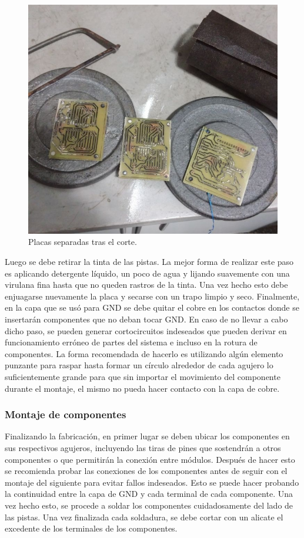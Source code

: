 \begin{figure}[ht!]
	\centering
	\includegraphics[width=0.6\linewidth]{imagenes/pcbeando/pos-corte.jpeg}
	\caption{Placas separadas tras el corte.}
	\label{fig:pos-corte}
\end{figure}

Luego se debe retirar la tinta de las pistas. La mejor forma de realizar este paso es aplicando detergente líquido, un poco de agua y lijando suavemente con una virulana fina hasta que no queden rastros de la tinta. Una vez hecho esto debe enjuagarse nuevamente la placa y secarse con un trapo limpio y seco.
Finalmente, en la capa que se usó para GND se debe quitar el cobre en los contactos donde se insertarán componentes que no deban tocar GND. En caso de no llevar a cabo dicho paso, se pueden generar cortocircuitos indeseados que pueden derivar en funcionamiento erróneo de partes del sistema e incluso en la rotura de componentes. La forma recomendada de hacerlo es utilizando algún elemento punzante para raspar hasta formar un círculo alrededor de cada agujero lo suficientemente grande para que sin importar el movimiento del componente durante el montaje, el mismo no pueda hacer contacto con la capa de cobre.


\subsubsection{Montaje de componentes}

Finalizando la fabricación, en primer lugar se deben ubicar los componentes en sus respectivos agujeros, incluyendo las tiras de pines que sostendrán a otros componentes o que permitirán la conexión entre módulos. Después de hacer esto se recomienda probar las conexiones de los componentes antes de seguir con el montaje del siguiente para evitar fallos indeseados. Esto se puede hacer probando la continuidad entre la capa de GND y cada terminal de cada componente. Una vez hecho esto, se procede a soldar los componentes cuidadosamente del lado de las pistas. Una vez finalizada cada soldadura, se debe cortar con un alicate el excedente de los terminales de los componentes.

